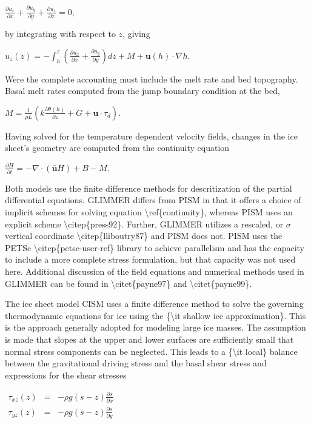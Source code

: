 $
\frac{\partial u_x}{\partial x} + 
\frac{\partial u_y}{\partial y} +
\frac{\partial u_z}{\partial z} = 0,
$

by integrating with respect to $z$, giving

$
u_z(z) = -\int_h^z \left( \frac{\partial u_x}{\partial x} + \frac{\partial
u_y}{\partial y}\right ) dz + M + \mathbf{u}(h) \cdot \nabla h.
$

Were the complete accounting must include the melt rate and bed
topography. Basal melt rates computed from the jump boundary condition
at the bed,

$
M = \frac{1}{\rho L} \left ( k \frac{\partial
\theta(h)}{\partial z} + G + \mathbf{u} \cdot \tau_d \right ).
$

Having solved for the temperature dependent velocity fields, changes in
the ice sheet's geometry are computed from the continuity equation

$
\frac{\partial H}{\partial t} = - \nabla \cdot (\mathbf{\bar u} H) + B - M.
$

Both models use the finite difference methods for descritization of the
partial differential equations. GLIMMER differs from PISM in that it
offers a choice of implicit schemes for solving equation
\textbackslash{}ref\{continuity\}, whereas PISM uses an explicit scheme
\textbackslash{}citep\{press92\}. Further, GLIMMER utilizes a rescaled,
or $\sigma$ vertical coordinate \textbackslash{}citep\{lliboutry87\} and
PISM does not. PISM uses the PETSc
\textbackslash{}citep\{petsc-user-ref\} library to achieve parallelism
and has the capacity to include a more complete stress formulation, but
that capacity was not used here. Additional discussion of the field
equations and numerical methods used in GLIMMER can be found in
\textbackslash{}citet\{payne97\} and \textbackslash{}citet\{payne99\}.

The ice sheet model CISM uses a finite difference method to solve the
governing thermodynamic equations for ice using the \{\textbackslash{}it
shallow ice approximation\}. This is the approach generally adopted for
modeling large ice masses. The assumption is made that slopes at the
upper and lower surfaces are sufficiently small that normal stress
components can be neglected. This leads to a \{\textbackslash{}it
local\} balance between the gravitational driving stress and the basal
shear stress and expressions for the shear stresses

$\begin{matrix}
\tau_{xz}(z)&=&-\rho g \left(s - z \right) \frac{\partial s}{\partial x}  \\
\tau_{yz}(z)&=&-\rho g \left(s - z \right) \frac{\partial s}{\partial y}
\end{matrix}$

